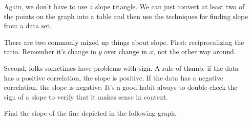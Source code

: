Again, we don't have to use a slope triangle. We can just convert at least two of the points on the graph into a table and then use the techniques for finding slope from a data set.

There are two commonly mixed up things about slope. First: reciprocalizing the ratio. Remember it's change in $y$ over change in $x$, not the other way around.

Second, folks sometimes have problems with sign. A rule of thumb: if the data has a positive correlation, the slope is positive. If the data has a negative correlation, the slope is negative. It's a good habit always to double-check the sign of a slope to verify that it makes sense in context.

\begin{boxedex}
Find the slope of the line depicted in the following graph.

\begin{center}
\end{center}


\end{boxedex}
